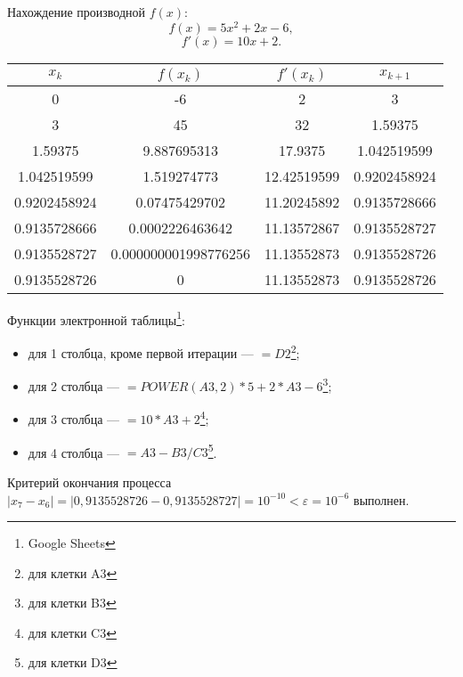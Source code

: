 \documentclass[10pt, a4paper, titlepage]{article}
\begin{document}
Нахождение производной $f(x)$:
$$f(x)=5x^2+2x-6,$$
$$f'(x)=10x+2.$$

\begin{center}
    \begin{tabular}{|c|c|c|c|}
        \hline
        $x_k$ & $f(x_k)$ & $f'(x_k)$ & $x_{k+1}$ \\ \hline
        
        0 & -6 & 2 & 3 \\ \hline
        
        3 &	45 & 32 & 1.59375 \\ \hline
        
        1.59375	& 9.887695313 &	17.9375 & 1.042519599 \\ \hline
        
        1.042519599 & 1.519274773 & 12.42519599 & 0.9202458924 \\ \hline
        
        0.9202458924 & 0.07475429702 & 11.20245892 & 0.9135728666 \\ \hline
        
        0.9135728666 & 0.0002226463642 & 11.13572867 & 0.9135528727 \\ \hline
        
        0.9135528727 & 0.000000001998776256	& 11.13552873 & 0.9135528726 \\ \hline
        
        0.9135528726 & 0 & 11.13552873 & 0.9135528726 \\ \hline
        
    \end{tabular}
\end{center}

Функции электронной таблицы\footnote{Google Sheets}:
\begin{itemize}
    \item для 1 столбца, кроме первой итерации --- $=D2$\footnote{для клетки A3};
    
    \item для 2 столбца --- $=POWER(A3, 2)*5+2*A3-6$\footnote{для клетки B3};
    
    \item для 3 столбца --- $=10*A3+2$\footnote{для клетки C3};
    
    \item для 4 столбца --- $=A3-B3/C3$\footnote{для клетки D3}.
\end{itemize}

Критерий окончания процесса $|x_7-x_6|=|0,9135528726-0,9135528727|=10^{-10}<\varepsilon=10^{-6}$ выполнен. 
\end{document}
